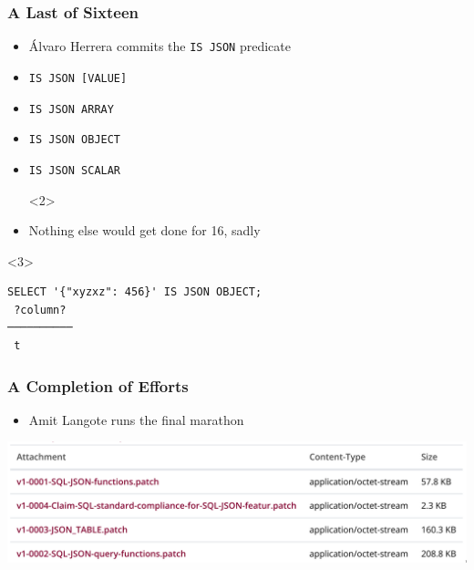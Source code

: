 \begin{frame}[fragile]
  \frametitle{A Last of Sixteen}
  \begin{itemize}
    \item Álvaro Herrera commits the \texttt{IS JSON} predicate
    \item[]
    \item \texttt{IS JSON [VALUE]}
    \item \texttt{IS JSON ARRAY}
    \item \texttt{IS JSON OBJECT}
    \item \texttt{IS JSON SCALAR}
\pause
    \item[]<2>
    \item<2> Nothing else would get done for 16, sadly
  \end{itemize}

  \begin{onlyenv}<3>
    \begin{lstlisting}
SELECT '{"xyzxz": 456}' IS JSON OBJECT;
 ?column? 
──────────
 t
    \end{lstlisting}
  \end{onlyenv}
\end{frame}

\begin{frame}
  \frametitle{A Completion of Efforts}

  \begin{itemize}
    \item Amit Langote runs the final marathon
  \end{itemize}

  \includegraphics[width=\textwidth,frame]{patchlist-20230621.png}
\end{frame}

